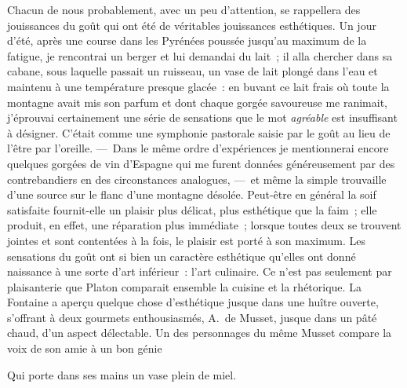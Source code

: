\documentclass[french,twoside]{book} %
\begin{document}
Chacun de nous probablement, avec un peu d’attention, se rappellera des jouissances du goût qui ont été de véritables jouissances esthétiques. Un jour d’été, après une course dans les Pyrénées poussée jusqu’au maximum de la fatigue, je rencontrai un berger et lui demandai du lait ; il alla chercher dans sa cabane, sous laquelle passait un ruisseau, un vase de lait plongé dans l’eau et maintenu à une température presque glacée : en buvant ce lait frais où toute la montagne avait mis son parfum et dont chaque gorgée savoureuse me ranimait, j’éprouvai certainement une série de sensations que le mot \emph{agréable} est insuffisant à désigner. C’était comme une symphonie pastorale saisie par le goût au lieu de l’être par l’oreille. — Dans le même ordre d’expériences je mentionnerai encore quelques  gorgées de vin d’Espagne qui me furent données généreusement par des contrebandiers en des circonstances analogues, — et même la simple trouvaille d’une source sur le flanc d’une montagne désolée. Peut-être en général la soif satisfaite fournit-elle un plaisir plus délicat, plus esthétique que la faim ; elle produit, en effet, une réparation plus immédiate ; lorsque toutes deux se trouvent jointes et sont contentées à la fois, le plaisir est porté à son maximum. Les sensations du goût ont si bien un caractère esthétique qu’elles ont donné naissance à une sorte d’art inférieur : l’art culinaire. Ce n’est pas seulement par plaisanterie que Platon comparait ensemble la cuisine et la rhétorique. La Fontaine a aperçu quelque chose d’esthétique jusque dans une huître ouverte, s’offrant à deux gourmets enthousiasmés, A. de Musset, jusque dans un pâté chaud, d’un aspect délectable. Un des personnages du même Musset compare la voix de son amie à un bon génie\par

Qui porte dans ses mains un vase plein de miel.\\
\end{document}
